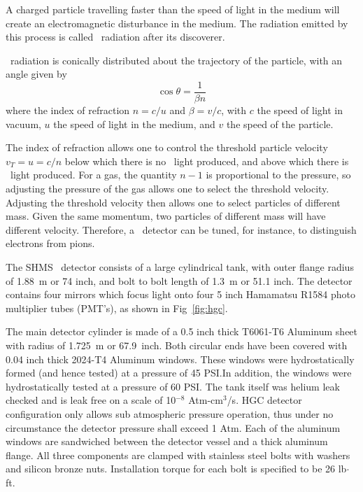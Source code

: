 
A charged particle travelling faster
than the speed of light in the medium will create an electromagnetic
disturbance in the medium. The radiation emitted by this process is
called \Cerenkov\ radiation after its discoverer.

\Cerenkov\ radiation is conically distributed about the trajectory of the
particle, with an angle given by
$$
	\cos{\theta} = \frac{1}{\beta n}
$$
where the index of refraction $n = c/u$ and $\beta = v/c$, with $c$
the speed of light in vacuum, $u$ the speed of light in the medium,
and $v$ the speed of the particle.

The index of refraction allows one to control the threshold particle velocity 
$v_{T}=u=c/n$ below which there is no \Cerenkov\ light produced, and above which there 
is \Cerenkov\ light produced.  For a gas, the quantity $n-1$ is proportional to the pressure, 
so adjusting the pressure of the gas allows one to select the
threshold velocity. Adjusting the threshold velocity then allows one to select particles of
different mass.  Given the same momentum, two particles of different mass
will have different velocity.  Therefore, a \Cerenkov\ detector can be tuned,
for instance, to distinguish electrons from pions.



The SHMS \Cerenkov\ detector consists of a large cylindrical tank,
with outer flange radius of 1.88~m or 74 inch, and bolt to bolt length
of 1.3~m or 51.1 inch. The detector contains four mirrors which focus
light onto four 5 inch Hamamatsu R1584 photo multiplier tubes (PMT's),
as shown in Fig~\ref{fig:hgc}.


The main detector cylinder is made of a 0.5 inch thick T6061-T6
Aluminum sheet with radius of 1.725~m or 67.9~inch. Both circular ends
have been covered with 0.04 inch thick 2024-T4 Aluminum windows. These
windows were hydrostatically formed (and hence tested) at a pressure
of 45 PSI.In addition, the windows were hydrostatically tested at a
pressure of 60 PSI. The tank itself was helium leak checked and is
leak free on a scale of 10$^{-8}$ Atm-cm$^3$/s. HGC detector
configuration only allows sub atmospheric pressure operation, thus
under no circumstance the detector pressure shall exceed 1 Atm. Each
of the aluminum windows are sandwiched between the detector vessel and
a thick aluminum flange. All three components are clamped with
stainless steel bolts with washers and silicon bronze
nuts. Installation torque for each bolt is specified to be 26
lb$\cdot$ft.

